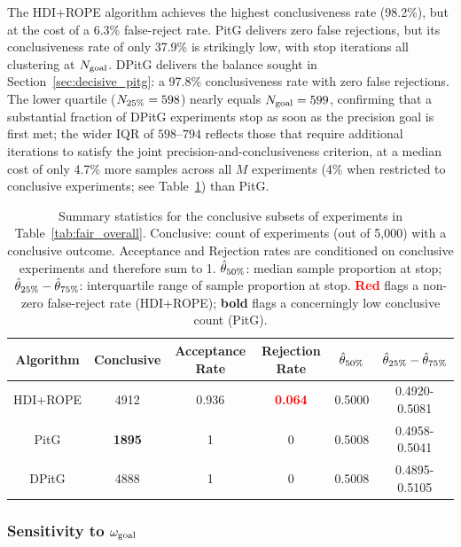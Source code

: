 The HDI+ROPE algorithm achieves the highest conclusiveness rate (98.2\%), but at the cost of a 6.3\%
false-reject rate. PitG delivers zero false rejections, but its conclusiveness rate of
only 37.9\% is strikingly low, with stop iterations all clustering at $N_{\rm goal}$.
DPitG delivers the balance sought in Section~\ref{sec:decisive_pitg}: a 97.8\%
conclusiveness rate with zero false
rejections. The lower quartile ($N_{\rm 25\%}=598$) nearly equals $N_{\rm goal}=599$,
confirming that a substantial fraction of DPitG experiments stop as soon as the
precision goal is first met; the wider IQR of $598$--$794$ reflects those that
require additional iterations to satisfy the joint precision-and-conclusiveness
criterion, at a median cost of only 4.7\% more samples across all $M$ experiments
(4\% when restricted to conclusive experiments; see Table~\ref{tab:fair_conclusive})
than PitG.


\begin{table}[h!]
  \begin{center}
  \begin{tabular}{c|c|c|c|c|c}
    \hline
    Algorithm & Conclusive & Acceptance Rate & Rejection Rate &  $\hat{\theta}_{\rm 50\%}$ & $\hat{\theta}_{\rm 25\%} - \hat{\theta}_{\rm 75\%}$\\
    \hline
    HDI+ROPE & 4912 & 0.936 & \textcolor{red}{\textbf{0.064}} & 0.5000 & 0.4920-0.5081 \\
    PitG     &  \textbf{1895} & 1     & 0     & 0.5008 & 0.4958-0.5041 \\
    DPitG    & 4888 & 1     & 0     & 0.5008 & 0.4895-0.5105\\
    \hline
  \end{tabular}
  \caption{Summary statistics for the conclusive subsets of experiments in
  Table~\ref{tab:fair_overall}.
  Conclusive: count of experiments (out of 5{,}000) with a conclusive outcome.
  Acceptance and Rejection rates are conditioned on conclusive experiments
  and therefore sum to 1.
  $\hat{\theta}_{\rm 50\%}$: median sample proportion at stop;
  $\hat{\theta}_{\rm 25\%} - \hat{\theta}_{\rm 75\%}$: interquartile range of
  sample proportion at stop.
  \textcolor{red}{\textbf{Red}} flags a non-zero false-reject rate (HDI+ROPE); \textbf{bold} flags a concerningly low conclusive count (PitG).}
  \label{tab:fair_conclusive}
\end{center}
\end{table}

\subsubsection{Sensitivity to $\omega_{\rm goal}$}\label{sec:goal_impact}


